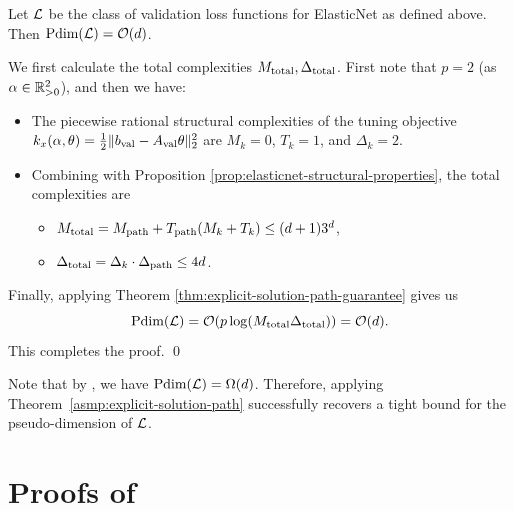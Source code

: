 \begin{corollary} Let $\mathcal{L}$ be the class of validation loss functions for ElasticNet as defined above. Then $\text{\normalfont Pdim}(\mathcal{L}) = \mathcal{O}(d)$.
\end{corollary}
\proof
    We first calculate the total complexities $M_\textup{total}, \Delta_\textup{total}$. First note that $p = 2$ (as $\alpha \in \mathbb{R}^2_{>0}$), and then we have:
    \begin{itemize}
        \item The piecewise rational structural complexities of the tuning objective $k_x(\alpha, \theta) = \frac{1}{2}\|b_\textup{val} - A_\textup{val}\theta\|_2^2$ are $M_k = 0$, $T_k = 1$, and $\Delta_k = 2$.

        \item Combining with Proposition \ref{prop:elasticnet-structural-properties}, the total complexities are
        \begin{itemize}
            \item  $M_\textup{total} = M_\textup{path} + T_\textup{path}(M_k + T_k) \leq (d + 1)3^d$, 
            \item $\Delta_\textup{total} = \Delta_k \cdot \Delta_\textup{path} \leq 4d$.
        \end{itemize}
    \end{itemize}

    Finally, applying Theorem \ref{thm:explicit-solution-path-guarantee} gives us
    \[
        \text{\normalfont Pdim}(\mathcal{L}) = \mathcal{O}(p\log(M_\textup{total} \Delta_\textup{total})) = \mathcal{O}(d).
    \]
    This completes the proof.
\qed
\begin{remark}
    Note that by \citet[Theorem 3.5]{balcan2023new}, we have $\text{\normalfont Pdim}(\mathcal{L}) = \Omega(d)$. Therefore, applying Theorem~\ref{asmp:explicit-solution-path} successfully recovers a tight bound for the pseudo-dimension of $\mathcal{L}$.
\end{remark}

\section{Proofs of }
\label{appendix:applications}

